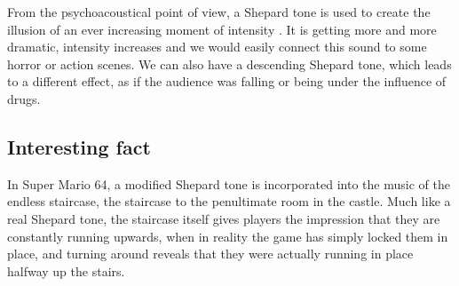 \documentclass[11pt,a4paper]{article}
\begin{document}
From the psychoacoustical point of view, a Shepard tone is used to create the illusion of an ever increasing moment of intensity \cite{wiki}. It is getting more and more dramatic, intensity increases and we would easily connect this sound to some horror or action scenes. We can also have a descending Shepard tone, which leads to a different effect, as if the audience was falling or being under the influence of drugs.

\subsection{Interesting fact}
In Super Mario 64, a modified Shepard tone is incorporated into the music of the endless staircase, the staircase to the penultimate room in the castle. Much like a real Shepard tone, the staircase itself gives players the impression that they are constantly running upwards, when in reality the game has simply locked them in place, and turning around reveals that they were actually running in place halfway up the stairs. \cite{wiki}














\end{document}
